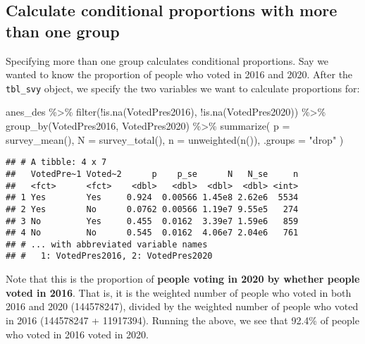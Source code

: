 \documentclass[
]{krantz}
\makeatletter
\newenvironment{Shaded}{\begin{snugshade}}{\end{snugshade}}
\newcommand{\AttributeTok}[1]{\textcolor[rgb]{0.61,0.61,0.61}{#1}}
\newcommand{\FunctionTok}[1]{\textcolor[rgb]{0,0,0}{#1}}
\newcommand{\NormalTok}[1]{#1}
\newcommand{\SpecialCharTok}[1]{\textcolor[rgb]{0,0,0}{#1}}
\newcommand{\StringTok}[1]{\textcolor[rgb]{0.5,0.5,0.5}{#1}}
\newenvironment{kframe}{%
\medskip{}
\setlength{\fboxsep}{.8em}
 \def\at@end@of@kframe{}%
 \ifinner\ifhmode%
  \def\at@end@of@kframe{\end{minipage}}%
  \begin{minipage}{\columnwidth}%
 \fi\fi%
 \def\FrameCommand##1{\hskip\@totalleftmargin \hskip-\fboxsep
 \colorbox{shadecolor}{##1}\hskip-\fboxsep
     \hskip-\linewidth \hskip-\@totalleftmargin \hskip\columnwidth}%
 \MakeFramed {\advance\hsize-\width
   \@totalleftmargin\z@ \linewidth\hsize
   \@setminipage}}%
 {\par\unskip\endMakeFramed%
 \at@end@of@kframe}
\renewenvironment{Shaded}{\begin{kframe}}{\end{kframe}}
\makeatother
\begin{document}
\hypertarget{calculate-conditional-proportions-with-more-than-one-group}{%
\subsection{Calculate conditional proportions with more than one group}\label{calculate-conditional-proportions-with-more-than-one-group}}

Specifying more than one group calculates conditional proportions. Say we wanted to know the proportion of people who voted in 2016 and 2020. After the \texttt{tbl\_svy} object, we specify the two variables we want to calculate proportions for:

\begin{Shaded}
\begin{Highlighting}[]
\NormalTok{anes\_des }\SpecialCharTok{\%\textgreater{}\%}
  \FunctionTok{filter}\NormalTok{(}\SpecialCharTok{!}\FunctionTok{is.na}\NormalTok{(VotedPres2016), }\SpecialCharTok{!}\FunctionTok{is.na}\NormalTok{(VotedPres2020)) }\SpecialCharTok{\%\textgreater{}\%}
  \FunctionTok{group\_by}\NormalTok{(VotedPres2016, VotedPres2020) }\SpecialCharTok{\%\textgreater{}\%}
  \FunctionTok{summarize}\NormalTok{(}
    \AttributeTok{p =} \FunctionTok{survey\_mean}\NormalTok{(),}
    \AttributeTok{N =} \FunctionTok{survey\_total}\NormalTok{(),}
    \AttributeTok{n =} \FunctionTok{unweighted}\NormalTok{(}\FunctionTok{n}\NormalTok{()),}
    \AttributeTok{.groups =} \StringTok{"drop"}
\NormalTok{  )}
\end{Highlighting}
\end{Shaded}

\begin{verbatim}
## # A tibble: 4 x 7
##   VotedPre~1 Voted~2      p    p_se      N   N_se     n
##   <fct>      <fct>    <dbl>   <dbl>  <dbl>  <dbl> <int>
## 1 Yes        Yes     0.924  0.00566 1.45e8 2.62e6  5534
## 2 Yes        No      0.0762 0.00566 1.19e7 9.55e5   274
## 3 No         Yes     0.455  0.0162  3.39e7 1.59e6   859
## 4 No         No      0.545  0.0162  4.06e7 2.04e6   761
## # ... with abbreviated variable names
## #   1: VotedPres2016, 2: VotedPres2020
\end{verbatim}

Note that this is the proportion of \textbf{people voting in 2020 by whether people voted in 2016}. That is, it is the weighted number of people who voted in both 2016 and 2020 (144578247), divided by the weighted number of people who voted in 2016 (144578247 + 11917394). Running the above, we see that 92.4\% of people who voted in 2016 voted in 2020.
\end{document}
